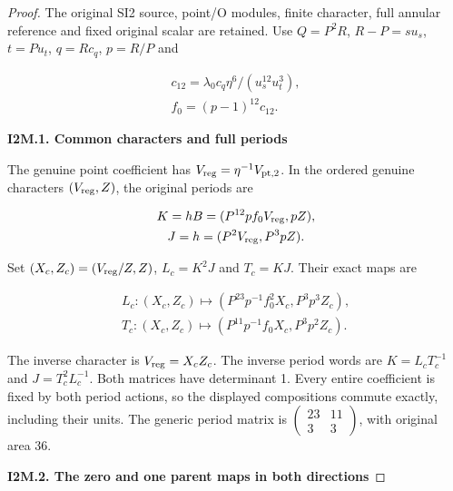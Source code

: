 \begin{proof}
\par\nobreak

The original SI2 source, point/O modules, finite character,
full annular reference and fixed original scalar are retained.
Use \(Q=P^{2}R\), \(R-P=s u_s\), \(t=P u_t\), \(q=R c_q\), \(p=R/P\) and

\[
\begin{gathered}
c_{12}=\lambda_0 c_q \eta^{6}/(u_s^{12} u_t^{3}), \\
f_{0}=(p-1)^{12} c_{12}.
\end{gathered}
\]

\par

\medskip\noindent\textbf{I2M.1. Common characters and full periods}

\par\nobreak

The genuine point coefficient has \(V_{\rm reg}=\eta^{-1} V_{{\rm pt},2}\). In the
ordered genuine characters \((V_{\rm reg},Z)\), the original periods are

\[
\begin{gathered}
K=hB=(P^{12} p f_{0} V_{\rm reg},pZ), \\
J=h=(P^{2} V_{\rm reg},P^{3}pZ).
\end{gathered}
\]

Set \((X_c,Z_c)=(V_{\rm reg}/Z,Z)\), \(L_c=K^{2}J\) and \(T_c=KJ\). Their exact maps are

\[
\begin{gathered}
L_c:(X_c,Z_c)\longmapsto (P^{23} p^{-1} f_{0}^{2} X_c,P^{3}p^{3} Z_c), \\
T_c:(X_c,Z_c)\longmapsto (P^{11} p^{-1} f_{0} X_c,P^{3}p^{2} Z_c).
\end{gathered}
\]

The inverse character is \(V_{\rm reg}=X_c Z_c\). The inverse period words
are \(K=L_c T_c^{-1}\) and \(J=T_c^{2} L_c^{-1}\). Both matrices have determinant 1.
Every entire coefficient is fixed by both period actions, so
the displayed compositions commute exactly, including their
units. The generic period matrix is \(\begin{pmatrix}23&11\\3&3\end{pmatrix}\), with
original area 36.

\par

\medskip\noindent\textbf{I2M.2. The zero and one parent maps in both directions}

\par\nobreak


\end{proof}
